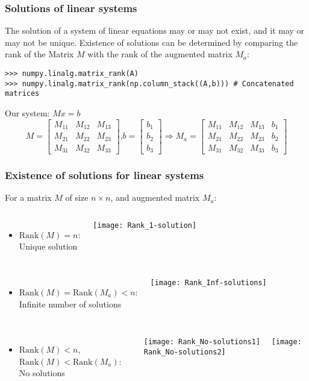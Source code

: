 \begin{frame}[fragile]
  \frametitle{Solutions of linear systems}
  The solution of a system of linear equations may or may not exist, and it may or may not be unique. Existence of solutions can be determined by comparing the rank of the Matrix $M$ with the rank of the augmented matrix $M_a$:
  \begin{lstlisting}
>>> numpy.linalg.matrix_rank(A)
>>> numpy.linalg.matrix_rank(np.column_stack((A,b))) # Concatenated matrices
  \end{lstlisting}
  Our system: $Mx = b$\\
  \[ 
    M = \begin{bmatrix}
    M_{11} & M_{12} & M_{13}\\ 
    M_{21} & M_{22} & M_{23}\\ 
    M_{31} & M_{32} & M_{33}
    \end{bmatrix} \text{,} b=\begin{bmatrix}b_1\\b_2\\b_3  \end{bmatrix} \Rightarrow 
    M_a =     \begin{bmatrix}
    M_{11} & M_{12} & M_{13} & b_1\\ 
    M_{21} & M_{22} & M_{23} & b_2\\ 
    M_{31} & M_{32} & M_{33} & b_3
    \end{bmatrix}
  \]
\end{frame}

\begin{frame}
 \frametitle{Existence of solutions for linear systems}
  For a matrix $M$ of size $n \times n$, and augmented matrix $M_a$:
 \begin{columns}
 \begin{itemize}
   \item $\text{Rank}(M) = n$:\\ Unique solution
 \end{itemize}
   \texttt{[image: Rank\_1-solution]}
 \end{columns}
 \pause
  \begin{columns}
 \begin{itemize}
   \item $\text{Rank}(M) = \text{Rank}(M_a) < n$:\\ Infinite number of solutions
 \end{itemize}
   \texttt{[image: Rank\_Inf-solutions]}
 \end{columns}
 \pause
  \begin{columns}
 \begin{itemize}
   \item $\text{Rank}(M) < n$, $\text{Rank}(M) < \text{Rank}(M_a)$:\\ No solutions
 \end{itemize}
   \texttt{[image: Rank\_No-solutions1]} \ \ 
   \texttt{[image: Rank\_No-solutions2]}
 \end{columns}
\end{frame}
 
